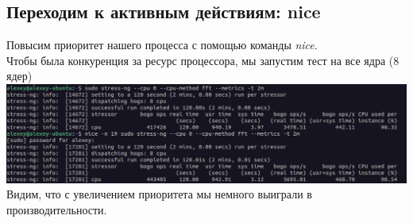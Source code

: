 \subsection{Переходим к активным действиям: nice}
Повысим приоритет нашего процесса с помощью команды \textit{nice}.\\
Чтобы была конкуренция за ресурс процессора, мы запустим тест на все ядра (8 ядер)\\
\includegraphics[width=\textwidth]{image/nice.png}
Видим, что с увеличением приоритета мы немного выиграли в производительности.
